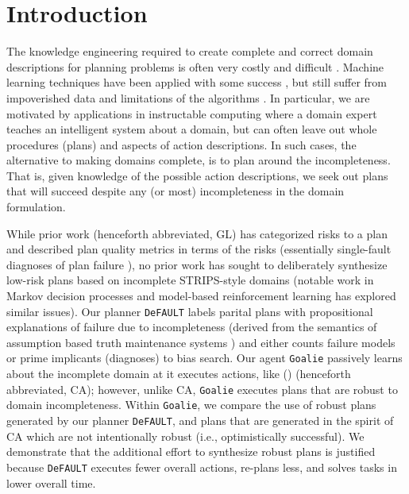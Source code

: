 \documentclass[letterpaper]{article}
\def\default{{\tt DeFAULT}}
\def\goalie{{\tt Goalie}}
\def\citep#1{\cite{#1}}
\def\citet#1{\citeauthor{#1} (\citeyear{#1})}
\begin{document}
\section{Introduction}
The knowledge engineering required to create complete and correct domain
descriptions for planning problems is often very costly and difficult
\citep{modellite,arms}.  Machine learning techniques have been applied with some
success \citep{arms}, but still suffer from impoverished data and limitations of
the algorithms \citep{modellite}.   In particular, we are motivated by
applications in instructable computing \citep{mable} where a domain expert
teaches an intelligent system about a domain, but can often leave out whole
procedures (plans) and aspects of action descriptions.   In such cases, the
alternative to making domains complete, is to plan around the incompleteness. 
That is, given knowledge of the possible action descriptions, we seek out plans
that will succeed despite any (or most) incompleteness in the domain
formulation.

While prior work \citep{Garland02} (henceforth abbreviated, GL) has categorized
risks to a plan and described plan quality metrics in terms of the risks
(essentially single-fault diagnoses of plan failure \citep{dekleer}), no
prior work has sought to deliberately synthesize low-risk plans based on
incomplete STRIPS-style domains (notable work in Markov decision processes
\citep{NE:05}  and model-based reinforcement learning \citep{citeulike:112017}
has explored similar issues).  Our planner \default{} labels parital
plans with propositional explanations of failure due to incompleteness (derived
from the semantics of assumption based truth maintenance systems
\cite{USU-CS-TR-11-001}) and either counts failure models or prime implicants (diagnoses) to bias search.
Our agent \goalie{} passively learns about the incomplete domain at it
executes actions, like \citet{DBLP:conf/aips/ChangA06} (henceforth
abbreviated, CA); however, unlike CA, \goalie{} executes plans that are robust
to domain incompleteness.  Within \goalie{}, we compare the use of robust plans
generated by our planner \default{}, and plans that are generated in the
spirit of CA which are not intentionally robust (i.e., optimistically
successful).  We demonstrate that the additional effort to synthesize robust
plans is justified because \default{} executes fewer overall actions, re-plans
less, and solves tasks in lower overall time.
\end{document}
